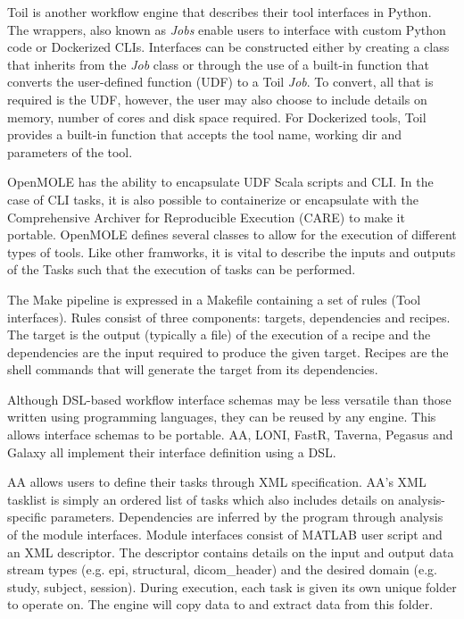             Toil is another workflow engine that describes their tool interfaces
            in Python. The wrappers, also known as \textit{Jobs} enable users to
            interface with custom Python code or Dockerized \cite{merkel2014docker} 
            CLIs. Interfaces can be constructed either by creating a class that
            inherits from the \textit{Job} class or through the use of a 
            built-in function that converts the user-defined function (UDF) to a 
            Toil \textit{Job}. To convert, all that is required is the UDF,
            however, the user may also choose to include details on memory, 
            number of cores and disk space required. For Dockerized tools, Toil
            provides a built-in function that accepts the tool name, working dir
            and parameters of the tool.

            OpenMOLE has the ability to encapsulate UDF Scala scripts and CLI. 
            In the case of CLI tasks, it is also possible to containerize or 
            encapsulate with the Comprehensive Archiver for Reproducible Execution (CARE) \cite{Janin:2014:CCA:2618137.2618138} to make it portable. OpenMOLE
            defines several classes to allow for the execution of different 
            types of tools. Like other framworks, it is vital to describe the
            inputs and outputs of the Tasks such that the execution of tasks 
            can be performed. 

            The Make pipeline is expressed in a Makefile containing a set of 
            rules (Tool interfaces). Rules consist of three components: targets, 
            dependencies and recipes. The target is the output (typically a 
            file) of the 
            execution of a recipe and the dependencies are the input required to 
            produce the given target. Recipes are the shell commands that will
            generate the target from its dependencies. 

            Although DSL-based workflow interface schemas may be less versatile
            than those written using programming languages, they
            can be reused by any engine. This allows interface schemas to be 
            portable. AA, LONI, FastR, Taverna, Pegasus and Galaxy all 
            implement their interface definition using a DSL.

            AA 
            allows users to define their tasks through XML specification. AA's 
            XML tasklist is simply an ordered list of tasks which also includes
            details on analysis-specific parameters. Dependencies are
            inferred by the program through analysis of the module interfaces.
            Module interfaces consist of MATLAB user script and an XML 
            descriptor. The descriptor contains details on the input and output
            data stream types (e.g. epi, structural, dicom\_header) 
            and the desired domain (e.g. study, subject, session). During 
            execution, each task is given its own unique folder to operate on. 
            The engine will copy data to and extract data from this folder.

